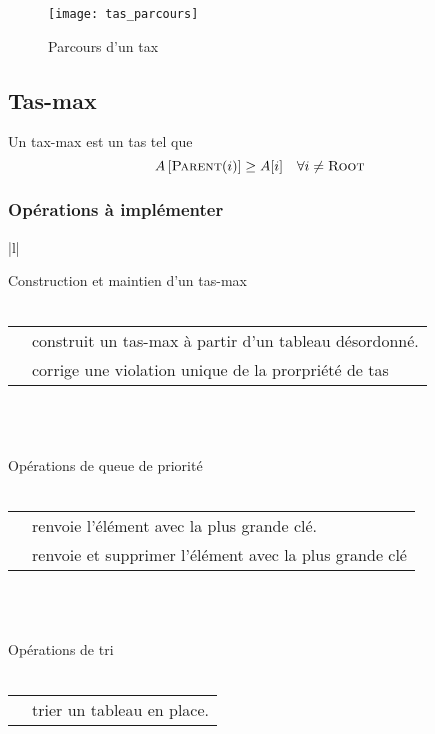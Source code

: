 \documentclass[12pt,a4paper]{book}
\begin{document}
\begin{figure}[h]
\centering
\texttt{[image: tas\_parcours]}
\caption{Parcours d'un tax}
\label{fig:tas_parcours}
\end{figure}
\subsection{Tas-max}
Un tax-max est un tas tel que $$A\left[\text{\textsc{Parent}}(i)\right] \geq A[i] \quad \forall i \neq \text{\textsc{Root}}$$

\subsubsection{Opérations à implémenter}
\begin{center}
\begin{tabular}{|l|}

\hline
Construction et maintien d'un tas-max \\
\hline \\
\begin{tabular}{p{5cm}|p{10cm}} 
     \rouge{\textsc{Build-Max-Heap}} & construit un tas-max à partir d'un tableau désordonné. \\\rule{0pt}{20pt}
     \rouge{\textsc{Max-Heapify}} & corrige une violation unique de la prorpriété de tas 
\end{tabular} \\ \rule{0pt}{20pt} \\
\hline
\hline
Opérations de queue de priorité \\
\hline \\
\begin{tabular}{p{5cm}|p{10cm}}\rule{0pt}{20pt} 
     \rouge{\textsc{Heap-Maximum}} & renvoie l'élément avec la plus grande clé. \\\rule{0pt}{20pt}
     \rouge{\textsc{Heap-Extract-Max}} & renvoie et supprimer l'élément avec la plus grande clé 
\end{tabular} \\ \rule{0pt}{20pt} \\
\hline 
\hline
Opérations de tri \\
\hline \\
\begin{tabular}{p{5cm}|p{10cm}}
     \rouge{\textsc{Heapsort}} & trier un tableau en place. 
\end{tabular} \rule{0pt}{20pt}\\ \hline
\end{tabular}
\end{center}
\end{document}
